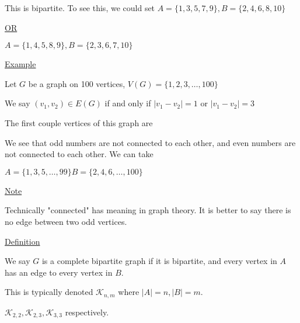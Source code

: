 \documentclass{article}
\begin{document}
This is bipartite. To see this, we could set $A = \{1,3,5,7,9\}, B = \{2,4,6,8,10\}$

\underline{OR}

$A = \{1,4,5,8,9\}, B = \{2,3,6,7,10\}$


\underline{Example}

Let $G$ be a graph on 100 vertices, $V(G) = \{1,2,3,\ldots, 100\}$

We say $(v_1, v_2) \in E(G)$ if and only if $|v_1 - v_2| = 1$ or $|v_1 - v_2| = 3$

The first couple vertices of this graph are 

\begin{center}
\end{center}

We see that odd numbers are not connected to each other, and even numbers are not connected to each other. We can take 

$A = \{1,3,5,\ldots,99\} B = \{2,4,6,\ldots,100\}$

\underline{Note}

Technically "connected" has meaning in graph theory. It is better to say there is no edge between two odd vertices. 

\underline{Definition}

We say $G$ is a complete bipartite graph if it is bipartite, and every vertex in $A$ has an edge to every vertex in $B$. 

This is typically denoted $\mathcal{K}_{n,m}$ where $|A| = n, |B| = m$.

$\mathcal{K}_{2,2}, \mathcal{K}_{2,3}, \mathcal{K}_{3,3}$ respectively.
\end{document}
